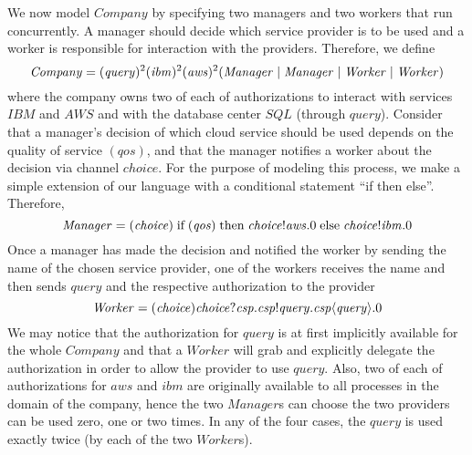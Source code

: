 We now model $\mathit{Company}$ by specifying two managers and two workers that run concurrently. A manager should decide which service provider is to be 
used and a worker is responsible for interaction with the providers. %
Therefore, we define
%
$$\mathit{Company}= (\mathit{query})^2(\mathit{ibm})^2(\mathit{aws})^2(\mathit{Manager} \;|\; \mathit{Manager} \;|\; \mathit{Worker} \;|\; \mathit{Worker})$$
%
where the company owns two of each of authorizations to interact with services $\mathit{IBM}$ and $\mathit{AWS}$ and with the database center $\mathit{SQL}$
(through $\mathit{query}$). 
Consider that a manager's decision of which cloud service should be used
depends on the quality of service $(\mathit{qos})$, and  
that the manager notifies a worker about the decision via channel $\mathit{choice}$. 
For the purpose of modeling this process, we make a simple extension of our  language with a 
conditional statement ``if then else''. Therefore,
%
$$
\mathit{Manager}  =  (\mathit{choice})
 \; \mbox{if} \;(\mathit{qos}) \; \mbox{then} \; \mathit{choice}!\mathit{aws}.0 \;\mbox{else}\; \mathit{choice}!\mathit{ibm}. 0
$$
%
Once a manager has made the decision and notified the worker by sending the name of the chosen service provider, one of the workers receives the name and then 
sends $\mathit{query}$ and the respective authorization to the provider
%
$$\mathit{Worker}= (\mathit{choice}) \mathit{choice}?\mathit{csp}. {\mathit{csp}}!\mathit{query}. \mathit{csp}\langle\mathit{query}\rangle.0$$
%
We may notice that the authorization for $\mathit{query}$ is at first implicitly available for the whole 
$\mathit{Company}$ and that a $\mathit{Worker}$ will grab and explicitly delegate the authorization 
 in order to allow the provider to use $\mathit{query}$.
Also, two of each of authorizations for $\mathit{aws}$ and $\mathit{ibm}$ are originally available to all processes in the domain of the company, hence the two $\mathit{Manager}$s
can choose the two providers
can be used zero, one or two times. %
In any of the four cases, the $\mathit{query}$ is used exactly 
twice (by each of the two $\mathit{Worker}$s).

